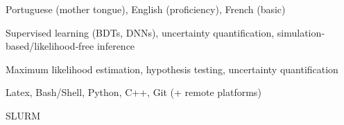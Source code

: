 
\begin{cvskills}

{Portuguese (mother tongue), English (proficiency), French (basic)}

{Supervised learning (BDTs, DNNs), uncertainty quantification, simulation‐based/likelihood‐free inference}

{Maximum likelihood estimation, hypothesis testing, uncertainty quantification}

{Latex, Bash/Shell, Python, C++, Git (+ remote platforms)}


{SLURM}

\end{cvskills}